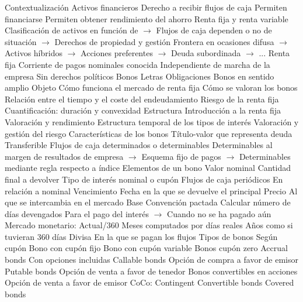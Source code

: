 \documentclass{nuevotema}
\begin{document}
\begin{esquemal}
	\1[] 
		\2 Contextualización
			\3 Activos financieros
				\4 Derecho a recibir flujos de caja
				\4 Permiten financiarse
				\4 Permiten obtener rendimiento del ahorro
			\3 Renta fija y renta variable
				\4 Clasificación de activos en función de
				\4[] $\to$ Flujos de caja dependen o no de situación
				\4[] $\to$ Derechos de propiedad y gestión
				\4 Frontera en ocasiones difusa
				\4[] $\to$ Activos híbridos
				\4[] $\to$ Acciones preferentes
				\4[] $\to$ Deuda subordinada
				\4[] $\to$ ...
			\3 Renta fija
				\4 Corriente de pagos nominales conocida
				\4 Independiente de marcha de la empresa
				\4 Sin derechos políticos
				\4 Bonos
				\4 Letras
				\4 Obligaciones
				\4 Bonos en sentido amplio
		\2 Objeto
			\3 Cómo funciona el mercado de renta fija
			\3 Cómo se valoran los bonos
			\3 Relación entre el tiempo y el coste del endeudamiento
			\3 Riesgo de la renta fija
				\4 Cuantificación: duración y convexidad
		\2 Estructura
			\3 Introducción a la renta fija
			\3 Valoración y rendimiento
			\3 Estructura temporal de los tipos de interés
			\3 Valoración y gestión del riesgo
	\1 
		\2 Características de los bonos
			\3 Título-valor que representa deuda
				\4 Transferible
			\3 Flujos de caja determinados o determinables
				\4 Determinables al margen de resultados de empresa
				\4[] $\to$ Esquema fijo de pagos
				\4[] $\to$ Determinables mediante regla respecto a índice
		\2 Elementos de un bono
			\3 Valor nominal
				\4 Cantidad final a devolver
			\3 Tipo de interés nominal o cupón
				\4 Flujos de caja periódicos
				\4[] En relación a nominal
			\3 Vencimiento
				\4 Fecha en la que se devuelve el principal
			\3 Precio
				\4 Al que se intercambia en el mercado
			\3 Base
				\4 Convención pactada
				\4 Calcular número de días devengados
				\4[] Para el pago del interés
				\4[] $\to$ Cuando no se ha pagado aún
				\4 Mercado monetario: Actual/360
				\4[] Meses computados por días reales
				\4[] Años como si tuvieran 360 días
			\3 Divisa
				\4 En la que se pagan los flujos
		\2 Tipos de bonos
			\3 Según cupón
				\4 Bono con cupón fijo
				\4 Bono con cupón variable
				\4 Bonos cupón zero
				\4 Accrual bonds
			\3 Con opciones incluidas
				\4 Callable bonds
				\4[] Opción de compra a favor de emisor
				\4 Putable bonds
				\4[] Opción de venta a favor de tenedor
				\4 Bonos convertibles en acciones
				\4[] Opción de venta a favor de emisor
				\4[] CoCo: Contingent Convertible bonds
			\3 Covered bonds

\end{esquemal}
\end{document}

